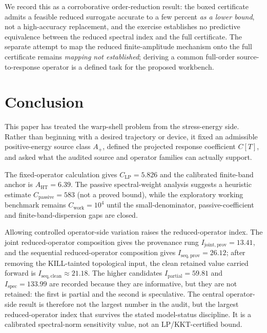 \documentclass[11pt,a4paper]{article}
\begin{document}
We record this as a corroborative order-reduction result: the boxed certificate admits a feasible reduced surrogate accurate to a few percent \emph{as a lower bound}, not a high-accuracy replacement, and the exercise establishes no predictive equivalence between the reduced spectral index and the full certificate. The separate attempt to map the reduced finite-amplitude mechanism onto the full certificate remains \emph{mapping not established}; deriving a common full-order source-to-response operator is a defined task for the proposed workbench.

\section{Conclusion}\label{sec:conclusion}

This paper has treated the warp-shell problem from the stress-energy side. Rather than beginning with a desired trajectory or device, it fixed an admissible positive-energy source class $A_{+}$, defined the projected response coefficient $C[T]$, and asked what the audited source and operator families can actually support.

The fixed-operator calculation gives $C_{\mathrm{LP}}=5.826$ and the calibrated finite-band anchor is $A_{\mathrm{HT}}=6.39$. The passive spectral-weight analysis suggests a heuristic estimate $C_{\mathrm{passive}}=583$ (not a proved bound), while the exploratory working benchmark remains $C_{\mathrm{work}}=10^{4}$ until the small-denominator, passive-coefficient and finite-band-dispersion gaps are closed.

Allowing controlled operator-side variation raises the reduced-operator index. The joint reduced-operator composition gives the provenance rung $I_{\mathrm{joint,prov}}=13.41$, and the sequential reduced-operator composition gives $I_{\mathrm{seq,prov}}=26.12$; after removing the KILL-tainted topological input, the clean retained value carried forward is $I_{\mathrm{seq,clean}}\approx21.18$. The higher candidates $I_{\mathrm{partial}}=59.81$ and $I_{\mathrm{spec}}=133.99$ are recorded because they are informative, but they are not retained: the first is partial and the second is speculative. The central operator-side result is therefore not the largest number in the audit, but the largest reduced-operator index that survives the stated model-status discipline. It is a calibrated spectral-norm sensitivity value, not an LP/KKT-certified bound.
\end{document}
